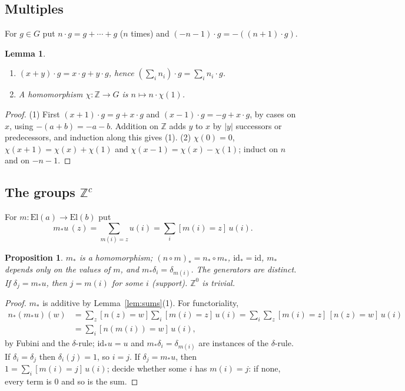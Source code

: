 \documentclass[11pt]{amsart}
\newtheorem{proposition}[theorem]{Proposition}
\newtheorem{lemma}[theorem]{Lemma}
\theoremstyle{definition}
\theoremstyle{remark}
\newcommand{\El}{\mathrm{El}}
\newcommand{\Z}{\mathbb{Z}}
\begin{document}
\subsection*{Multiples} For $g\in G$ put $n\cdot g=g+\cdots+g$ ($n$
times) and $(-n-1)\cdot g=-((n+1)\cdot g)$.

\begin{lemma}\label{lem:mult}
\begin{enumerate}
\item $(x+y)\cdot g=x\cdot g+y\cdot g$, hence
$(\sum_i n_i)\cdot g=\sum_i n_i\cdot g$.
\item A homomorphism $\chi:\Z\to G$ is $n\mapsto n\cdot\chi(1)$.
\end{enumerate}
\end{lemma}
\begin{proof}
(1) First $(x+1)\cdot g=g+x\cdot g$ and $(x-1)\cdot g=-g+x\cdot g$, by
cases on $x$, using $-(a+b)=-a-b$. Addition on $\Z$ adds $y$ to $x$ by
$|y|$ successors or predecessors, and induction along this gives (1).
(2) $\chi(0)=0$, $\chi(x+1)=\chi(x)+\chi(1)$ and
$\chi(x-1)=\chi(x)-\chi(1)$; induct on $n$ and on $-n-1$.
\end{proof}

\subsection*{The groups $\Z^c$} For $m:\El(a)\to\El(b)$ put
\[
m_*u\,(z)=\sum_{m(i)=z}u(i)=\sum_{i}[m(i)=z]\,u(i).
\]

\begin{proposition}\label{prop:ab-push}
$m_*$ is a homomorphism; $(n\circ m)_*=n_*\circ m_*$,
$\mathrm{id}_*=\mathrm{id}$, $m_*$ depends only on the values of $m$, and
$m_*\delta_i=\delta_{m(i)}$. The generators are distinct. If
$\delta_j=m_*u$, then $j=m(i)$ for some $i$ (support). $\Z^0$ is trivial.
\end{proposition}
\begin{proof}
$m_*$ is additive by Lemma~\ref{lem:sums}(1). For functoriality,
\[
\begin{aligned}
n_*(m_*u)(w)&=\sum_z [n(z)=w]\sum_i [m(i)=z]\,u(i)
=\sum_i\sum_z [m(i)=z]\,[n(z)=w]\,u(i)\\
&=\sum_i [n(m(i))=w]\,u(i),
\end{aligned}
\]
by Fubini and the $\delta$-rule; $\mathrm{id}_*u=u$ and
$m_*\delta_i=\delta_{m(i)}$ are instances of the $\delta$-rule. If
$\delta_i=\delta_j$ then $\delta_i(j)=1$, so $i=j$. If $\delta_j=m_*u$,
then $1=\sum_i [m(i)=j]\,u(i)$; decide whether some $i$ has $m(i)=j$: if
none, every term is $0$ and so is the sum.
\end{proof}
\end{document}
